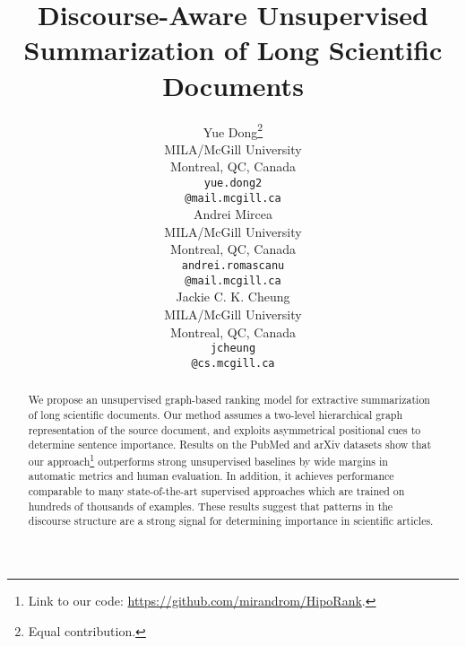 \documentclass[11pt,a4paper]{article}
\title{Discourse-Aware Unsupervised Summarization of Long Scientific Documents}
\author{Yue Dong\thanks{\;\;Equal contribution.}\\
MILA/McGill University \\
  Montreal, QC, Canada \\
  \texttt{yue.dong2} \\
  \texttt{@mail.mcgill.ca} \\
\And
  Andrei Mircea\samethanks\\
MILA/McGill University \\
  Montreal, QC, Canada \\
  \texttt{andrei.romascanu} \\
  \texttt{@mail.mcgill.ca} \\
   \And
Jackie C. K. Cheung\\
  MILA/McGill University \\
  Montreal, QC, Canada \\
  \texttt{jcheung} \\
  \texttt{@cs.mcgill.ca} \\
}
\date{}
\begin{document}
\maketitle
\begin{abstract}
We propose an unsupervised graph-based ranking model for  extractive summarization of long scientific documents. Our method assumes a two-level hierarchical graph representation of the source document, and exploits asymmetrical positional cues to determine sentence importance. Results on the PubMed and arXiv datasets show that our approach\footnote{Link to our code: \url{https://github.com/mirandrom/HipoRank}.} outperforms strong unsupervised baselines by wide margins in automatic metrics and human evaluation. In addition, it achieves performance comparable to many state-of-the-art supervised approaches which are trained on hundreds of thousands of examples. These results suggest that patterns in the discourse structure are a strong signal for determining importance in scientific articles.
\end{abstract}
\end{document}
